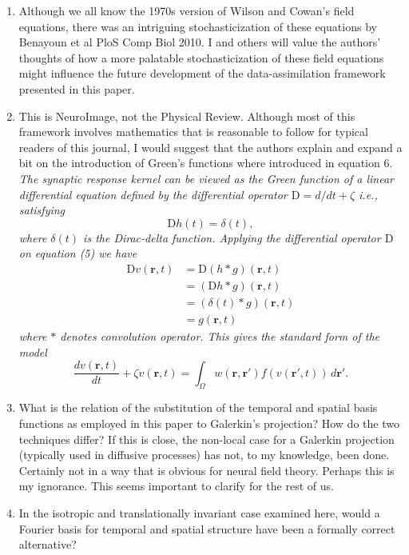\documentclass{article}
\begin{document}
\begin{enumerate}
	
\item Although we all know the 1970s version of Wilson and Cowan's field equations, there was an intriguing stochasticization of these equations by Benayoun et al PloS Comp Biol 2010. I and others will value the authors' thoughts of how a more palatable stochasticization of these field equations might influence the future development of the data-assimilation framework presented in this paper.

\item This is NeuroImage, not the Physical Review. Although most of this framework involves mathematics that is reasonable to follow for typical readers of this journal, I would suggest that the authors explain and expand a bit on the introduction of Green's functions where introduced in equation 6.\\

\emph{The synaptic response kernel can be viewed as the Green function of a linear differential equation defined by the differential operator $\textrm{D}=d/dt + \zeta$ i.e., satisfying
\begin{equation}
	\label{GreensFuncDef} \textrm{D}h\left( t \right) = \delta \left( t \right), 
\end{equation} 
where $\delta(t)$ is the Dirac-delta function. Applying the differential operator $\textrm{D}$ on equation (5) we have
\begin{align}
 \textrm{D}v\left(\mathbf r,t\right)&= \textrm{D}\left(h\ast g\right)\left(\mathbf r,t\right)\\
&=\left(\textrm{D}h\ast g\right)\left(\mathbf r,t\right)\\
&=\left(\delta \left(t\right)\ast g\right)\left(\mathbf r,t\right)\\
&=g\left(\mathbf r,t\right)
\end{align}
where $\ast$ denotes convolution operator. This gives the standard form of the model
\begin{equation}
	\label{FinalFormContinuous} 
	\frac{dv\left( \mathbf{r},t \right)}{dt} + \zeta v\left( \mathbf{r},t \right) = \int_\Omega {w\left( \mathbf{r},\mathbf{r}' \right)f\left( {v\left( \mathbf{r}',t \right)} \right)\, d\mathbf{r}'}. 
\end{equation}}

\item What is the relation of the substitution of the temporal and spatial basis functions as employed in this paper to Galerkin's projection? How do the two techniques differ? If this is close, the non-local case for a Galerkin projection (typically used in diffusive processes) has not, to my knowledge, been done. Certainly not in a way that is obvious for neural field theory. Perhaps this is my ignorance. This seems important to clarify for the rest of us.
\item In the isotropic and translationally invariant case examined here, would a Fourier basis for temporal and spatial structure have been a formally correct alternative?\\


\end{enumerate}
\end{document}
